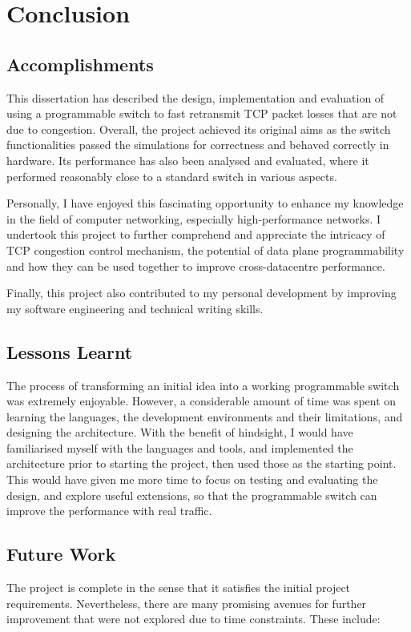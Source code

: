 \chapter{Conclusion}
\section{Accomplishments}
This dissertation has described the design, implementation and evaluation of using a programmable switch to fast retransmit TCP packet losses that are not due to congestion. Overall, the project achieved its original aims as the switch functionalities passed the simulations for correctness and behaved correctly in hardware. Its performance has also been analysed and evaluated, where it performed reasonably close to a standard switch in various aspects.

Personally, I have enjoyed this fascinating opportunity to enhance my knowledge in the field of computer networking, especially high-performance networks. I undertook this project to further comprehend and appreciate the intricacy of TCP congestion control mechanism, the potential of data plane programmability and how they can be used together to improve cross-datacentre performance.

Finally, this project also contributed to my personal development by improving my software engineering and technical writing skills.

\section{Lessons Learnt}
The process of transforming an initial idea into a working programmable switch was extremely enjoyable. However, a considerable amount of time was spent on learning the languages, the development environments and their limitations, and designing the architecture. With the benefit of hindsight, I would have familiarised myself with the languages and tools, and implemented the architecture prior to starting the project, then used those as the starting point. This would have given me more time to focus on testing and evaluating the design, and explore useful extensions, so that the programmable switch can improve the performance with real traffic. 

\section{Future Work}
The project is complete in the sense that it satisfies the initial project requirements. Nevertheless, there are many promising avenues for further improvement that were not explored due to time constraints. These include:

